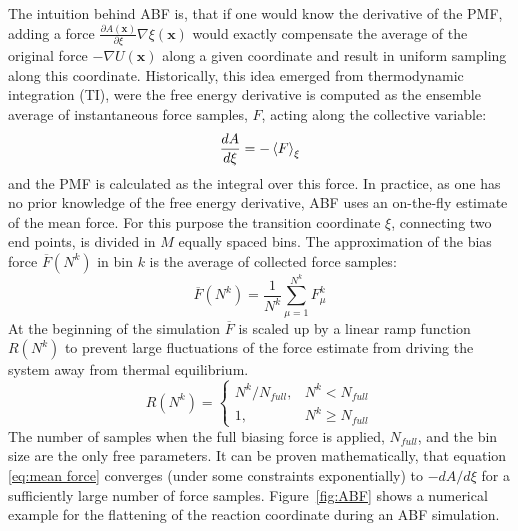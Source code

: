 The intuition behind ABF is, that if one would know the derivative of the PMF, adding a force $\frac{\partial A(\textbf{x})}{\partial \xi}\nabla\xi(\textbf{x})$ would exactly compensate the average of the original force $-\nabla U(\textbf{x})$ along a given coordinate and result in uniform sampling along this coordinate.\autocite{comer2015adaptive}
Historically, this idea emerged from thermodynamic integration (TI), were the free energy derivative  is computed as the ensemble average of instantaneous force samples, $F$, acting along the collective variable:
\begin{equation}
\frac{dA}{d\xi} = -\braket{F}_{\xi}
\end{equation}
and the PMF is calculated as the integral over this force.\autocite{kirkwood1935statistical,zwanzig1954high}
In practice, as one has no prior knowledge of the free energy derivative, ABF uses an on-the-fly estimate of the mean force. For this purpose the transition coordinate $\xi$, connecting two end points, is divided in $M$ equally spaced bins. The approximation of the bias force $\overline{F}(N^k)$ in bin $k$ is the average of collected force samples:\autocite{comer2015adaptive}
\begin{equation}
  \overline{F}(N^k) = \frac{1}{N^{k}} \sum_{\mu=1}^{N^{k}} F_{\mu}^{k}
  \label{eq:mean force}
\end{equation}
At the beginning of the simulation $\overline{F}$ is scaled up by a linear ramp function $R(N^k)$ to prevent large fluctuations of the force estimate from driving the system away from thermal equilibrium.\autocite{comer2015adaptive}
\begin{equation}
  R(N^k)=\left\{\begin{array}{ll} N^k/N_{full}, & N^{k} < N_{full} \\
                                             1, & N^{k} \geq  N_{full}
                \end{array}\right.
  \label{eq:ramp}
\end{equation}
The number of samples when the full biasing force is applied, $N_{full}$, and the bin size are the only free parameters.
It can be proven mathematically, that equation \ref{eq:mean force} converges (under some constraints exponentially) to $-dA/d\xi$ for a sufficiently large number of force samples.\autocite{alrachid2015long}
Figure~\ref{fig:ABF} shows a numerical example for the flattening of the reaction coordinate during an ABF simulation.

